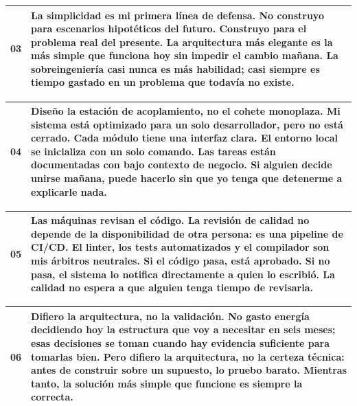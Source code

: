 \documentclass[14pt,a4paper,oneside]{extbook}
\begin{document}
\begin{table}[htbp]
\centering
\begin{tabular}{p{} p{}}
\toprule
\textbf{03} & \textbf{La simplicidad es mi primera línea de defensa. No construyo para escenarios hipotéticos del futuro. Construyo para el problema real del presente. La arquitectura más elegante es la más simple que funciona hoy sin impedir el cambio mañana. La sobreingeniería casi nunca es más habilidad; casi siempre es tiempo gastado en un problema que todavía no existe.} \\
\midrule
\bottomrule
\end{tabular}
\end{table}



\begin{table}[htbp]
\centering
\begin{tabular}{p{} p{}}
\toprule
\textbf{04} & \textbf{Diseño la estación de acoplamiento, no el cohete monoplaza. Mi sistema está optimizado para un solo desarrollador, pero no está cerrado. Cada módulo tiene una interfaz clara. El entorno local se inicializa con un solo comando. Las tareas están documentadas con bajo contexto de negocio. Si alguien decide unirse mañana, puede hacerlo sin que yo tenga que detenerme a explicarle nada.} \\
\midrule
\bottomrule
\end{tabular}
\end{table}



\begin{table}[htbp]
\centering
\begin{tabular}{p{} p{}}
\toprule
\textbf{05} & \textbf{Las máquinas revisan el código. La revisión de calidad no depende de la disponibilidad de otra persona: es una pipeline de CI/CD. El linter, los tests automatizados y el compilador son mis árbitros neutrales. Si el código pasa, está aprobado. Si no pasa, el sistema lo notifica directamente a quien lo escribió. La calidad no espera a que alguien tenga tiempo de revisarla.} \\
\midrule
\bottomrule
\end{tabular}
\end{table}



\begin{table}[htbp]
\centering
\begin{tabular}{p{} p{}}
\toprule
\textbf{06} & \textbf{Difiero la arquitectura, no la validación. No gasto energía decidiendo hoy la estructura que voy a necesitar en seis meses; esas decisiones se toman cuando hay evidencia suficiente para tomarlas bien. Pero difiero la arquitectura, no la certeza técnica: antes de construir sobre un supuesto, lo pruebo barato. Mientras tanto, la solución más simple que funcione es siempre la correcta.} \\
\midrule
\bottomrule
\end{tabular}
\end{table}
\end{document}
